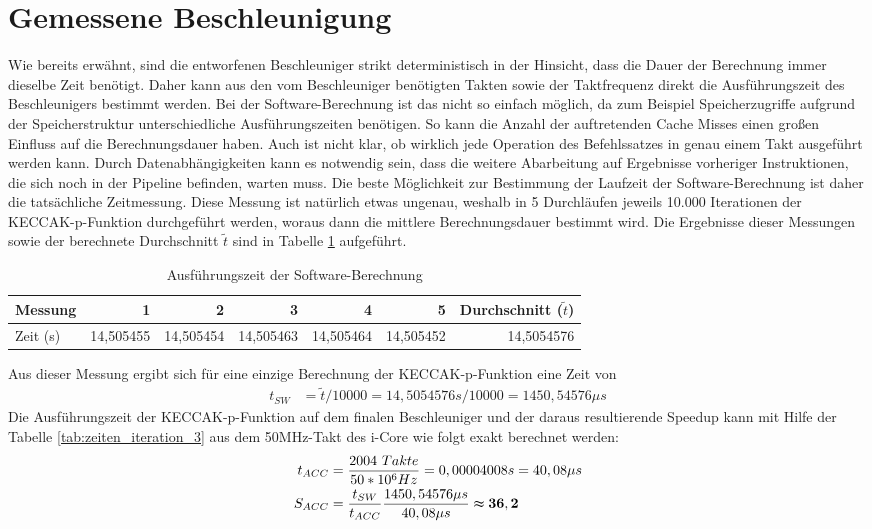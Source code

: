\section{Gemessene Beschleunigung}
Wie bereits erwähnt, sind die entworfenen Beschleuniger strikt deterministisch in der Hinsicht, dass die Dauer der Berechnung immer dieselbe Zeit benötigt.
Daher kann aus den vom Beschleuniger benötigten Takten sowie der Taktfrequenz direkt die Ausführungszeit des Beschleunigers bestimmt werden.
Bei der Software-Berechnung ist das nicht so einfach möglich, da zum Beispiel Speicherzugriffe aufgrund der Speicherstruktur unterschiedliche Ausführungszeiten benötigen.
So kann die Anzahl der auftretenden Cache Misses einen großen Einfluss auf die Berechnungsdauer haben. Auch ist nicht klar, ob wirklich jede Operation des Befehlssatzes
in genau einem Takt ausgeführt werden kann. Durch Datenabhängigkeiten kann es notwendig sein, dass die weitere Abarbeitung auf Ergebnisse vorheriger Instruktionen,
die sich noch in der Pipeline befinden, warten muss. Die beste Möglichkeit zur Bestimmung der Laufzeit der Software-Berechnung ist daher die tatsächliche Zeitmessung.
Diese Messung ist natürlich etwas ungenau, weshalb in 5 Durchläufen jeweils 10.000 Iterationen der KECCAK-p-Funktion durchgeführt werden, woraus dann die mittlere Berechnungsdauer bestimmt wird.
Die Ergebnisse dieser Messungen sowie der berechnete Durchschnitt $\tilde{t}$ sind in Tabelle \ref{tab:software_zeitmessung} aufgeführt.
\begin{table}
    \centering
    \begin{tabular}{lrrrrrr}
        Messung & 1 & 2 & 3 & 4 & 5 & Durchschnitt ($\tilde{t}$)\\
        \hline
        Zeit (s) & 14,505455 & 14,505454 & 14,505463 & 14,505464 & 14,505452 & 14,5054576
    \end{tabular}
    \label{tab:software_zeitmessung}
    \caption{Ausführungszeit der Software-Berechnung}
\end{table}
Aus dieser Messung ergibt sich für eine einzige Berechnung der KECCAK-p-Funktion eine Zeit von
\begin{align*}
    t_{SW} & = \tilde{t}/10000 = 14,5054576 s / 10000 = 1450,54576 \mu s
\end{align*}
Die Ausführungszeit der KECCAK-p-Funktion auf dem finalen Beschleuniger und der daraus resultierende Speedup kann
mit Hilfe der Tabelle \ref{tab:zeiten_iteration_3} aus dem 50MHz-Takt des i-Core wie folgt exakt berechnet werden:
\begin{align*}
    t_{ACC} & = \frac{2004\ Takte}{50 * 10^6Hz} = 0,00004008s = 40,08 \mu s \\
    S_{ACC} & = \frac{t_{SW}}{t_{ACC}}\frac{1450,54576 \mu s}{40,08 \mu s} \thickapprox \mathbf{36,2}
\end{align*}

